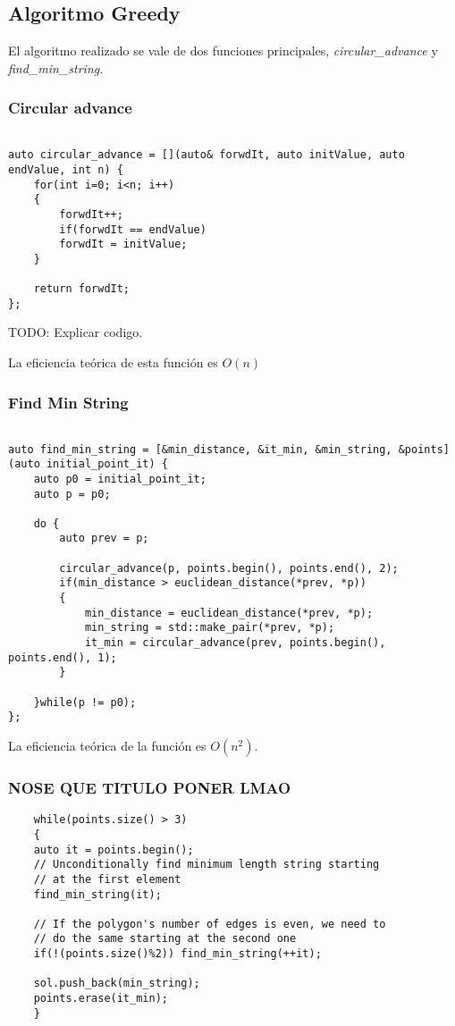 \documentclass[a4paper, 11pt]{article}
\begin{document}
\subsection{Algoritmo Greedy}
El algoritmo realizado se vale de dos funciones principales, \textit{circular\_advance} y \textit{find\_min\_string}.

\subsubsection{Circular advance}
\begin{lstlisting}

auto circular_advance = [](auto& forwdIt, auto initValue, auto endValue, int n) {
	for(int i=0; i<n; i++)
	{
		forwdIt++;
		if(forwdIt == endValue)
		forwdIt = initValue;
	}

	return forwdIt;
};
\end{lstlisting}

TODO: Explicar codigo.

La eficiencia teórica de esta función es $O(n)$

\subsubsection{Find Min String}
\begin{lstlisting}
	
auto find_min_string = [&min_distance, &it_min, &min_string, &points](auto initial_point_it) {
	auto p0 = initial_point_it;
	auto p = p0;
	
	do {
		auto prev = p;
	
		circular_advance(p, points.begin(), points.end(), 2);
		if(min_distance > euclidean_distance(*prev, *p))
		{
			min_distance = euclidean_distance(*prev, *p);
			min_string = std::make_pair(*prev, *p);
			it_min = circular_advance(prev, points.begin(), points.end(), 1);
		}
	
	}while(p != p0);
};
\end{lstlisting}

La eficiencia teórica de la función es $O(n^2)$.
\subsubsection{NOSE QUE TITULO PONER LMAO}

	\begin{lstlisting}
	while(points.size() > 3)
	{
	auto it = points.begin();
	// Unconditionally find minimum length string starting
	// at the first element
	find_min_string(it);
	
	// If the polygon's number of edges is even, we need to
	// do the same starting at the second one
	if(!(points.size()%2)) find_min_string(++it);
	
	sol.push_back(min_string);
	points.erase(it_min);
	}
	\end{lstlisting}
	
\end{document}
